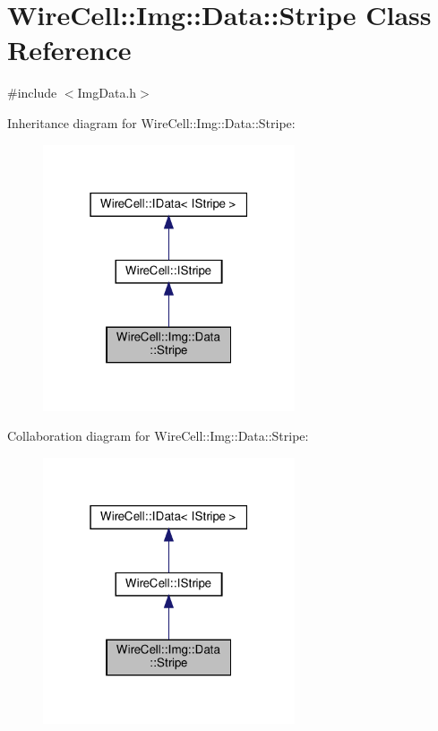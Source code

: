 \hypertarget{class_wire_cell_1_1_img_1_1_data_1_1_stripe}{}\section{Wire\+Cell\+:\+:Img\+:\+:Data\+:\+:Stripe Class Reference}
\label{class_wire_cell_1_1_img_1_1_data_1_1_stripe}


{\ttfamily \#include $<$Img\+Data.\+h$>$}



Inheritance diagram for Wire\+Cell\+:\+:Img\+:\+:Data\+:\+:Stripe\+:
\nopagebreak
\begin{figure}[H]
\begin{center}
\leavevmode
\includegraphics[width=211pt]{class_wire_cell_1_1_img_1_1_data_1_1_stripe__inherit__graph}
\end{center}
\end{figure}


Collaboration diagram for Wire\+Cell\+:\+:Img\+:\+:Data\+:\+:Stripe\+:
\nopagebreak
\begin{figure}[H]
\begin{center}
\leavevmode
\includegraphics[width=211pt]{class_wire_cell_1_1_img_1_1_data_1_1_stripe__coll__graph}
\end{center}
\end{figure}
